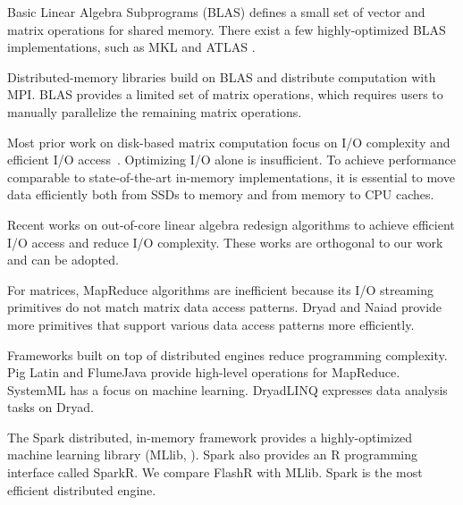 Basic Linear Algebra Subprograms (BLAS) defines a small set of vector and
matrix operations for shared memory. There exist a few highly-optimized BLAS
implementations, such as MKL \cite{mkl} and ATLAS \cite{atlas}. 

Distributed-memory libraries \cite{trilinos, petsc, elemental}
build on BLAS and distribute computation with MPI.
BLAS provides a limited set of matrix operations, which requires
users to manually parallelize the remaining matrix operations.

Most prior work on disk-based matrix computation focus on I/O complexity
and efficient I/O access~\cite{Toledo99, Quintana-Orti12}.
Optimizing I/O alone is insufficient.
To achieve performance comparable to state-of-the-art in-memory implementations,
it is essential to move data efficiently both from
SSDs to memory and from memory to CPU caches.

Recent works on out-of-core linear algebra \cite{Toledo99, Quintana-Orti12}
redesign algorithms to achieve efficient I/O access and reduce I/O
complexity. These works are orthogonal to our work and can be adopted.

For matrices, MapReduce \cite{mapreduce} algorithms are inefficient because 
its I/O streaming primitives do not match matrix data access patterns.
Dryad \cite{dryad} and Naiad \cite{naiad} provide more primitives 
that support various data access patterns more efficiently.

Frameworks built on top of distributed engines reduce programming complexity.
Pig Latin \cite{pig} and FlumeJava \cite{flumejava}
provide high-level operations for MapReduce.
SystemML \cite{systemml} has a focus on machine learning. 
DryadLINQ \cite{dryadlinq} expresses data analysis tasks on Dryad. 

The Spark \cite{spark} distributed, in-memory framework
provides a highly-optimized machine learning library (MLlib, \cite{mllib}).
Spark also provides an R programming interface called SparkR.  
We compare FlashR with MLlib. Spark is the most efficient distributed engine.

